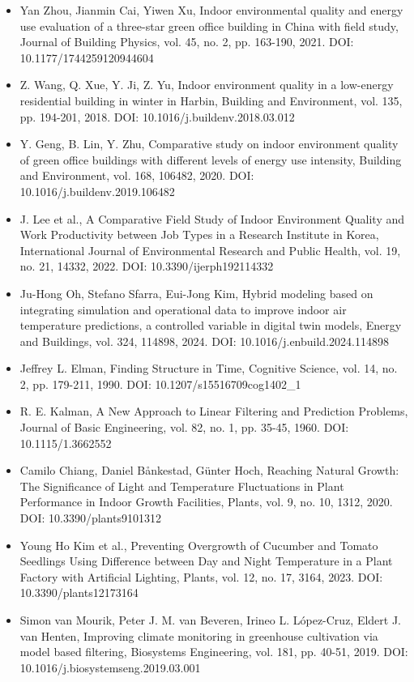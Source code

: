 \documentclass[12pt,a4paper]{article}
\begin{document}
\begin{itemize}
\item [22] Yan Zhou, Jianmin Cai, Yiwen Xu, Indoor environmental quality and energy use evaluation of a three-star green office building in China with field study, Journal of Building Physics, vol. 45, no. 2, pp. 163-190, 2021. DOI: 10.1177/1744259120944604
\item [23] Z. Wang, Q. Xue, Y. Ji, Z. Yu, Indoor environment quality in a low-energy residential building in winter in Harbin, Building and Environment, vol. 135, pp. 194-201, 2018. DOI: 10.1016/j.buildenv.2018.03.012
\item [24] Y. Geng, B. Lin, Y. Zhu, Comparative study on indoor environment quality of green office buildings with different levels of energy use intensity, Building and Environment, vol. 168, 106482, 2020. DOI: 10.1016/j.buildenv.2019.106482
\item [25] J. Lee et al., A Comparative Field Study of Indoor Environment Quality and Work Productivity between Job Types in a Research Institute in Korea, International Journal of Environmental Research and Public Health, vol. 19, no. 21, 14332, 2022. DOI: 10.3390/ijerph192114332
\item [26] Ju-Hong Oh, Stefano Sfarra, Eui-Jong Kim, Hybrid modeling based on integrating simulation and operational data to improve indoor air temperature predictions, a controlled variable in digital twin models, Energy and Buildings, vol. 324, 114898, 2024. DOI: 10.1016/j.enbuild.2024.114898
\item [27] Jeffrey L. Elman, Finding Structure in Time, Cognitive Science, vol. 14, no. 2, pp. 179-211, 1990. DOI: 10.1207/s15516709cog1402\_\allowbreak{}1
\item [28] R. E. Kalman, A New Approach to Linear Filtering and Prediction Problems, Journal of Basic Engineering, vol. 82, no. 1, pp. 35-45, 1960. DOI: 10.1115/1.3662552
\item [29] Camilo Chiang, Daniel Bånkestad, Günter Hoch, Reaching Natural Growth: The Significance of Light and Temperature Fluctuations in Plant Performance in Indoor Growth Facilities, Plants, vol. 9, no. 10, 1312, 2020. DOI: 10.3390/plants9101312
\item [30] Young Ho Kim et al., Preventing Overgrowth of Cucumber and Tomato Seedlings Using Difference between Day and Night Temperature in a Plant Factory with Artificial Lighting, Plants, vol. 12, no. 17, 3164, 2023. DOI: 10.3390/plants12173164
\item [31] Simon van Mourik, Peter J. M. van Beveren, Irineo L. López-Cruz, Eldert J. van Henten, Improving climate monitoring in greenhouse cultivation via model based filtering, Biosystems Engineering, vol. 181, pp. 40-51, 2019. DOI: 10.1016/j.biosystemseng.2019.03.001

\end{itemize}
\end{document}

